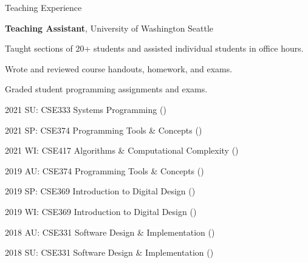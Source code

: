 \begin{rubric}{Teaching Experience}

\entry*[2018 -- 2021] %
	\textbf{Teaching Assistant}, University of Washington Seattle
	\par Taught sections of 20+ students and assisted individual students in office hours.
	\par Wrote and reviewed course handouts, homework, and exams.
	\par Graded student programming assignments and exams.
	\par 2021 SU: CSE333 Systems Programming (\pWangC{})
	\par 2021 SP: CSE374 Programming Tools \& Concepts (\pHazenM{})
	\par 2021 WI: CSE417 Algorithms \& Computational Complexity (\pWeberR{})
	\par 2019 AU: CSE374 Programming Tools \& Concepts (\pPirtleT{})
	\par 2019 SP: CSE369 Introduction to Digital Design (\pHsiaJ{})
	\par 2019 WI: CSE369 Introduction to Digital Design (\pHsiaJ{})
	\par 2018 AU: CSE331 Software Design \& Implementation (\pErnstM{})
	\par 2018 SU: CSE331 Software Design \& Implementation (\pPerlmutterL{})
\end{rubric}